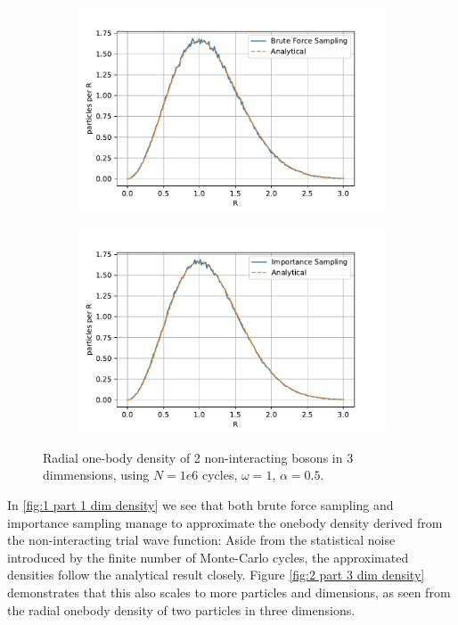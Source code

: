 \begin{figure}
	\begin{subfigure}{\textwidth}
		\centering
		\includegraphics[width=.8\linewidth]{figures/density3.pdf}
		\label{fig:sfig1}
	\end{subfigure}%
	\begin{subfigure}{\textwidth}
		\centering
		\includegraphics[width=.8\linewidth]{figures/density4.pdf}
		\label{fig:sfig2}
	\end{subfigure}
	\caption{Radial one-body density of 2 non-interacting bosons in 3 dimmensions, using $N = 1e6$ cycles, $\omega = 1$, $\alpha = 0.5$.}
	\label{fig:2 part 3 dim density}
\end{figure}

In \autoref{fig:1 part 1 dim density}  we see that both brute force sampling and importance sampling manage to approximate the onebody density derived from the non-interacting trial wave function: Aside from the statistical noise introduced by the finite number of Monte-Carlo cycles, the approximated densities follow the analytical result closely. Figure \autoref{fig:2 part 3 dim density} demonstrates that this also scales to more particles and dimensions, as seen from the radial onebody density of two particles in three dimensions. 


